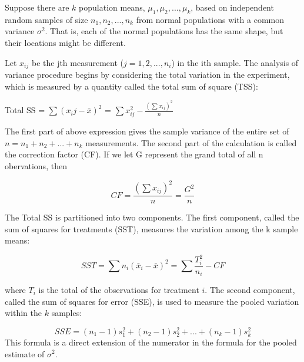 \documentclass[
  ignorenonframetext,
  aspectratio=169]{beamer}
\begin{document}
\begin{frame}{}
\protect\hypertarget{section-2}{}
\small

Suppose there are \(k\) population means, \(\mu_1, \mu_2, ..., \mu_k\),
based on independent random samples of size \(n_1, n_2, ..., n_k\) from
normal populations with a common variance \(\sigma^2\). That is, each of
the normal populations has the same shape, but their locations might be
different.

Let \(x_{ij}\) be the jth measurement (\(j = 1, 2, ..., n_i\)) in the
ith sample. The analysis of variance procedure begins by considering the
total variation in the experiment, which is measured by a quantity
called the total sum of square (TSS):

Total SS = \(\sum (x_ij - \bar{x})^2\) =
\(\sum x^2_{ij} - \frac{(\sum x_{ij})^2}{n}\)

The first part of above expression gives the sample variance of the
entire set of \(n = n_1 + n_2 + ... + n_k\) measurements. The second
part of the calculation is called the correction factor (CF). If we let
G represent the grand total of all n obervations, then

\[
CF = \frac{(\sum x_{ij})^2}{n} = \frac{G^2}{n}
\]
\end{frame}

\begin{frame}{}
\protect\hypertarget{section-3}{}
\small

The Total SS is partitioned into two components. The first component,
called the sum of squares for treatments (SST), measures the variation
among the k sample means:

\[
SST = \sum n_i (\bar{x}_i - \bar{x})^2 = \sum \frac{T^2_i}{n_i} - CF
\]

where \(T_i\) is the total of the observations for treatment \(i\). The
second component, called the sum of squares for error (SSE), is used to
measure the pooled variation within the \(k\) samples:

\[
SSE = (n_1 - 1)s_1^2 + (n_2 - 1)s_2^2 + ... + (n_k - 1)s_k^2
\] This formula is a direct extension of the numerator in the formula
for the pooled estimate of \(\sigma^2\).
\end{frame}
\end{document}
